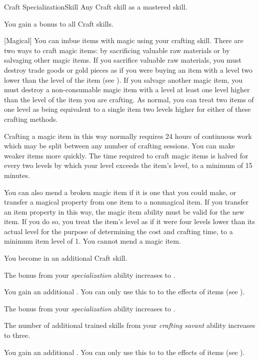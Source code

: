     \begin{feat}{Craft Specialization}{Skill}
        \featpre Any Craft skill as a mastered skill.

         You gain a  bonus to all Craft skills.

        [Magical] You can imbue items with magic using your crafting skill.
        There are two ways to craft magic items: by sacrificing valuable raw materials or by salvaging other magic items.
        If you sacrifice valuable raw materials, you must destroy trade goods or gold pieces as if you were buying an item with a level two lower than the level of the item  (see ).
        If you salvage another magic item, you must destroy a non-consumable magic item with a level at least one level higher than the level of the item you are crafting.
        As normal, you can treat two items of one level as being equivalent to a single item two levels higher for either of these crafting methods.

        Crafting a magic item in this way normally requires 24 hours of continuous work which may be split between any number of crafting sessions.
        You can make weaker items more quickly.
        The time required to craft magic items is halved for every two levels by which your level exceeds the item's level, to a minimum of 15 minutes.

        You can also mend a broken magic item if it is one that you could make, or transfer a magical property from one item to a nonmagical item.
        If you transfer an item property in this way, the magic item ability must be valid for the new item.
        If you do so, you treat the item's level as if it were four levels lower than its actual level for the purpose of determining the cost and crafting time, to a minimum item level of 1.
        You cannot mend a  magic item.

         You become  in an additional Craft skill.

         The bonus from your \textit{specialization} ability increases to .

         You gain an additional .
        You can only use this  to  to the effects of items (see ).

         The bonus from your \textit{specialization} ability increases to .

         The number of additional trained skills from your \textit{crafting savant} ability increases to three.

         You gain an additional .
        You can only use this  to  to the effects of items (see ).
    \end{feat}

